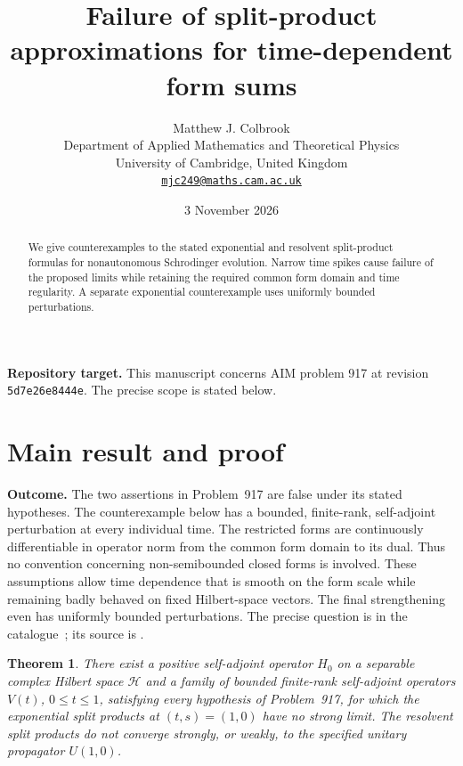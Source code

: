 \documentclass[11pt,a4paper]{article}
\title{\textbf{Failure of split-product approximations for time-dependent form sums}}
\author{Matthew J. Colbrook\\[3pt]
{\small Department of Applied Mathematics and Theoretical Physics}\\
{\small University of Cambridge, United Kingdom}\\
{\small\href{mailto:mjc249@maths.cam.ac.uk}{\texttt{mjc249@maths.cam.ac.uk}}}}
\date{3 November 2026}
\newtheorem{theorem}{Theorem}[section]
\theoremstyle{remark}
\begin{document}
\maketitle
\begin{abstract}
We give counterexamples to the stated exponential and resolvent split-product formulas for nonautonomous Schrodinger evolution. Narrow time spikes cause failure of the proposed limits while retaining the required common form domain and time regularity. A separate exponential counterexample uses uniformly bounded perturbations.
\end{abstract}
\noindent\textbf{Repository target.}
This manuscript concerns AIM problem 917 at revision
\texttt{5d7e26e8444e}. The precise scope is stated below.
\medskip

\section{Main result and proof}
\label{sec:917}

\textbf{Outcome.} The two assertions in Problem~917 are false under its
stated hypotheses. The counterexample below has a bounded, finite-rank,
self-adjoint perturbation at every individual time. The restricted forms
are continuously differentiable in operator norm from the common form
domain to its dual. Thus no convention concerning non-semibounded closed
forms is involved. These assumptions allow time dependence that is
smooth on the form scale while remaining badly behaved on fixed
Hilbert-space vectors. The final strengthening even has uniformly
bounded perturbations. The precise question is in the catalogue~\cite{AIM}; its
source is \cite[conditions (V), (V$'$), and Remark~(3), equations
(32)--(33)]{VV2011}.

\begin{theorem}\label{thm:917}
There exist a positive self-adjoint operator $H_0$ on a separable complex
Hilbert space $\mathcal H$ and a family of bounded finite-rank
self-adjoint operators $V(t)$, $0\le t\le1$, satisfying every hypothesis of
Problem~917, for which the exponential split products at $(t,s)=(1,0)$
have no strong limit. The resolvent split products do not converge
strongly, or weakly, to the specified unitary propagator $U(1,0)$.
\end{theorem}
\end{document}
